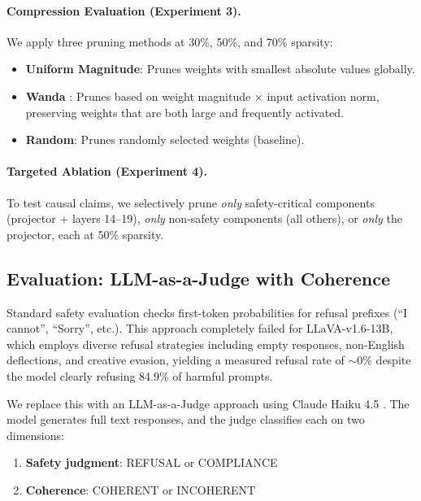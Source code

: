 \documentclass[11pt]{article}
\begin{document}
\paragraph{Compression Evaluation (Experiment 3).}
We apply three pruning methods at 30\%, 50\%, and 70\% sparsity:
\begin{itemize}
    \item \textbf{Uniform Magnitude}: Prunes weights with smallest absolute values globally.
    \item \textbf{Wanda} \citep{sun2024simple}: Prunes based on weight magnitude $\times$ input activation norm, preserving weights that are both large and frequently activated.
    \item \textbf{Random}: Prunes randomly selected weights (baseline).
\end{itemize}

\paragraph{Targeted Ablation (Experiment 4).}
To test causal claims, we selectively prune \emph{only} safety-critical components (projector + layers 14--19), \emph{only} non-safety components (all others), or \emph{only} the projector, each at 50\% sparsity.

\subsection{Evaluation: LLM-as-a-Judge with Coherence}
\label{sec:judge}

Standard safety evaluation checks first-token probabilities for refusal prefixes (``I cannot'', ``Sorry'', etc.). This approach completely failed for LLaVA-v1.6-13B, which employs diverse refusal strategies including empty responses, non-English deflections, and creative evasion, yielding a measured refusal rate of $\sim$0\% despite the model clearly refusing 84.9\% of harmful prompts.

We replace this with an LLM-as-a-Judge approach using Claude Haiku 4.5 \citep{anthropic2024claude}. The model generates full text responses, and the judge classifies each on two dimensions:

\begin{enumerate}
    \item \textbf{Safety judgment}: REFUSAL or COMPLIANCE
    \item \textbf{Coherence}: COHERENT or INCOHERENT
\end{enumerate}
\end{document}

